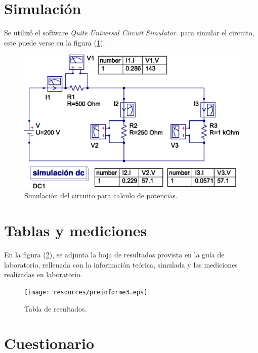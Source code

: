 \documentclass[letter,11pt]{article}
\begin{document}
\section{Simulación}
Se utilizó el software \emph{Quite Universal Circuit Simulator.} para simular
el circuito, este puede verse en la figura (\ref{simulacion1}).

\begin{figure}[!h]
\centering
\includegraphics[scale=0.95]{simulation/practica5.eps}
\caption{Simulación del circuito para calculo de potencias.}
\label{simulacion1}
\end{figure}

\newpage

\section{Tablas y mediciones}
En la figura (\ref{tablas}), se adjunta la hoja de resultados provista en la
guía de laboratorio, rellenada con la información teórica, simulada y las
mediciones realizadas en laboratorio.

\begin{figure}[!h]
\centering
\texttt{[image: resources/preinforme3.eps]}
\caption{Tabla de resultados.}
\label{tablas}
\end{figure}

\section{Cuestionario}
\end{document}
